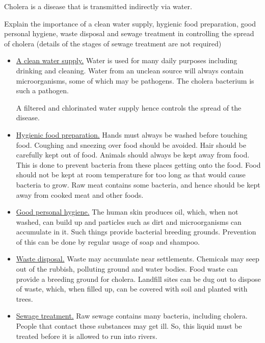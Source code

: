 Cholera is a disease that is transmitted indirectly via water.

\begin{point}
Explain the importance of a clean water supply, hygienic food preparation, good personal hygiene, waste 
disposal and sewage treatment in controlling the spread of cholera (details of the stages of sewage 
treatment are not required)
\end{point}

\begin{itemize}
\item\ul{A clean water supply.} Water is used for many daily purposes including drinking
	and cleaning. Water from an unclean source will always contain microorganisms, some of which
	may be pathogens. The cholera bacterium is such a pathogen. 

	A filtered and chlorinated water supply hence controls the spread of the disease.

\item\ul{Hygienic food preparation.} Hands must always be washed before touching food.
	Coughing and sneezing over food should be avoided. Hair should be carefully kept out of food.
	Animals should always be kept away from food. This is done to prevent bacteria from these places
	getting onto the food. Food should not be kept at room temperature for 
	too long as that would cause bacteria to grow. Raw meat contains some bacteria, and hence should
	be kept away from cooked meat and other foods.

\item\ul{Good personal hygiene.} The human skin produces oil, which, when not washed,
	can build up and particles such as dirt and microorganisms can accumulate in it. Such
	things provide bacterial breeding grounds. Prevention of this can be done by regular usage
	of soap and shampoo.

\item\ul{Waste disposal.} Waste may accumulate near settlements. Chemicals may seep out of
	the rubbish, polluting ground and water bodies. Food waste can provide a breeding ground
	for cholera. Landfill sites can be dug out to dispose of waste, which, when filled up, can
	be covered with soil and planted with trees.

\item\ul{Sewage treatment.} Raw sewage contains many bacteria, including cholera. People
	that contact these substances may get ill. So, this liquid must be treated before it is
	allowed to run into rivers.
\end{itemize}

